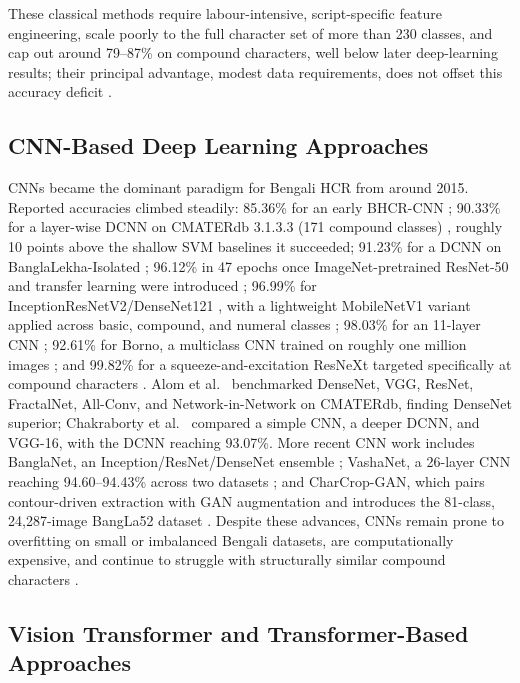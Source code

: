 These classical methods require labour-intensive, script-specific
feature engineering, scale poorly to the full character set of more than 230 classes, and cap out around 79--87\% on compound characters, well
below later deep-learning results; their principal advantage, modest
data requirements, does not offset this accuracy deficit \citep{ref26}.

\hypertarget{cnn-based-deep-learning-approaches}{%
\subsection{CNN-Based Deep Learning
Approaches}\label{cnn-based-deep-learning-approaches}}

CNNs became the dominant paradigm for Bengali HCR from around 2015.
Reported accuracies climbed steadily: 85.36\% for an early BHCR-CNN
\citep{ref7}; 90.33\% for a layer-wise DCNN on CMATERdb 3.1.3.3 (171
compound classes) \citep{ref9}, roughly 10 points above the shallow SVM
baselines it succeeded; 91.23\% for a DCNN on BanglaLekha-Isolated
\citep{ref10}; 96.12\% in 47 epochs once ImageNet-pretrained ResNet-50
and transfer learning were introduced \citep{ref11}; 96.99\% for
InceptionResNetV2/DenseNet121 \citep{ref12}, with a lightweight
MobileNetV1 variant applied across basic, compound, and numeral classes
\citep{ref13}; 98.03\% for an 11-layer CNN \citep{ref14}; 92.61\% for
Borno, a multiclass CNN trained on roughly one million images
\citep{ref15}; and 99.82\% for a squeeze-and-excitation ResNeXt targeted
specifically at compound characters \citep{ref16}. Alom et
al.~\citeyearpar{ref8} benchmarked DenseNet, VGG, ResNet, FractalNet,
All-Conv, and Network-in-Network on CMATERdb, finding DenseNet superior;
Chakraborty et al.~\citeyearpar{ref58} compared a simple CNN, a deeper
DCNN, and VGG-16, with the DCNN reaching 93.07\%. More recent CNN work
includes BanglaNet, an Inception/ResNet/DenseNet ensemble \citep{ref35};
VashaNet, a 26-layer CNN reaching 94.60--94.43\% across two datasets
\citep{ref36}; and CharCrop-GAN, which pairs contour-driven extraction
with GAN augmentation and introduces the 81-class, 24,287-image
BangLa52 dataset \citep{ref37}. Despite these advances, CNNs remain
prone to overfitting on small or imbalanced Bengali datasets, are
computationally expensive, and continue to struggle with structurally
similar compound characters \citep{ref17,ref23}.

\hypertarget{vision-transformer-and-transformer-based-approaches}{%
\subsection{Vision Transformer and Transformer-Based
Approaches}\label{vision-transformer-and-transformer-based-approaches}}

